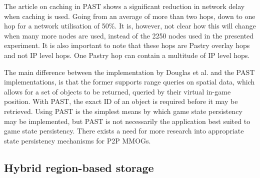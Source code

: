 \documentclass[10pt,a4paper,journal,cspaper,compsoc]{IEEEtran}
\begin{document}
The article on caching in PAST shows a significant reduction in network delay when caching is used. Going from an average of more than two hops, down
to one hop for a network utilisation of 50\%. It is, however, not clear how this will change when many more nodes are used, instead of the 2250 nodes
used in the presented experiment. It is also important to note that these hops are Pastry overlay hops and not IP level hops. One Pastry hop can
contain a multitude of IP level hops.

The main difference between the implementation by Douglas et al. and the PAST implementations, is that the former supports range queries on spatial
data, which allows for a set of objects to be returned, queried by their virtual in-game position. With PAST, the exact ID of an object is required
before it may be retrieved. Using PAST is the simplest means by which game state persistency may be implemented, but PAST is not necessarily the
application best suited to game state persistency. There exists a need for more research into appropriate state persistency mechanisms for P2P MMOGs.

\subsection{Hybrid region-based storage}
\label{hybrid_storage}
\end{document}
